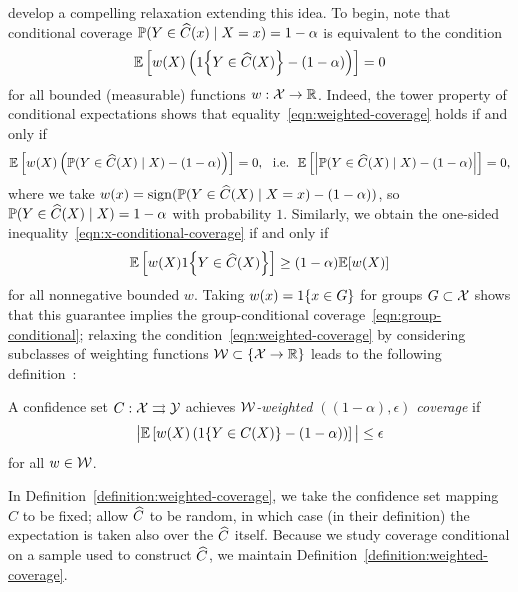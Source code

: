 \documentclass[11pt]{article}
\begin{document}
\citet*{GibbsChCa23} develop a compelling
relaxation extending this idea.
%
To begin, note that conditional coverage $\mathbb{P}(Y \in \widehat{C}(x) \mid X = x) =
1 - \alpha$ is equivalent to the condition
\begin{equation}
  \label{eqn:weighted-coverage}
  \mathbb{E}\left[w(X) \left(1\!\left\{Y \in \widehat{C}(X)\right\} - (1 - \alpha)\right)\right]
  = 0
\end{equation}
for all bounded (measurable) functions $w : \mathcal{X} \to \mathbb{R}$. Indeed, the
tower property of conditional expectations shows that
equality~\eqref{eqn:weighted-coverage} holds if and only if
\begin{equation*}
  \mathbb{E}\left[w(X) \left(\mathbb{P}(Y \in \widehat{C}(X) \mid X) - (1 - \alpha)\right)
    \right] = 0,
  ~~ \mbox{i.e.} ~~
  \mathbb{E}\left[\left|\mathbb{P}(Y \in \widehat{C}(X) \mid X) - (1 - \alpha)\right|
    \right] = 0,
\end{equation*}
where we take $w(x) = \mathop{\rm sign}(\mathbb{P}(Y \in \widehat{C}(X) \mid X = x) - (1 -
\alpha))$, so $\mathbb{P}(Y \in \widehat{C}(X) \mid X) = 1 - \alpha$ with
probability $1$.
%
Similarly, we obtain the one-sided
inequality~\eqref{eqn:x-conditional-coverage} if and only if
\begin{equation*}
  \mathbb{E}\left[w(X) 1\!\left\{Y \in \widehat{C}(X)\right\}\right] \ge (1 - \alpha)
  \mathbb{E}[w(X)]
\end{equation*}
for all nonnegative bounded $w$.
%
Taking $w(x) = 1\!\left\{x \in G\right\}$ for groups $G \subset \mathcal{X}$
shows that this guarantee implies the group-conditional
coverage~\eqref{eqn:group-conditional};
relaxing the
condition~\eqref{eqn:weighted-coverage} by considering subclasses of
weighting functions $\mathcal{W} \subset \{\mathcal{X} \to \mathbb{R}\}$
leads to the following definition~\cite{GibbsChCa23}:
\begin{definition}
  \label{definition:weighted-coverage}
  A confidence set $C : \mathcal{X} \rightrightarrows \mathcal{Y}$ achieves
  \emph{$\mathcal{W}$-weighted $((1 - \alpha), \epsilon)$ coverage} if
  \begin{equation*}
    \big|
    \mathbb{E}\left[w(X) \left(1\!\left\{Y \in C(X)\right\} - (1 - \alpha)\right)\right]
    \big| \le \epsilon
  \end{equation*}
  for all $w \in \mathcal{W}$.
\end{definition}
\noindent
In Definition~\ref{definition:weighted-coverage}, we take the
confidence set mapping $C$ to be fixed; \citeauthor{GibbsChCa23}
allow $\widehat{C}$ to be random, in which case (in their definition)
the expectation is taken also over the $\widehat{C}$ itself.
%
Because we study coverage conditional on a sample
used to construct $\widehat{C}$, we maintain
Definition~\ref{definition:weighted-coverage}.
\end{document}

